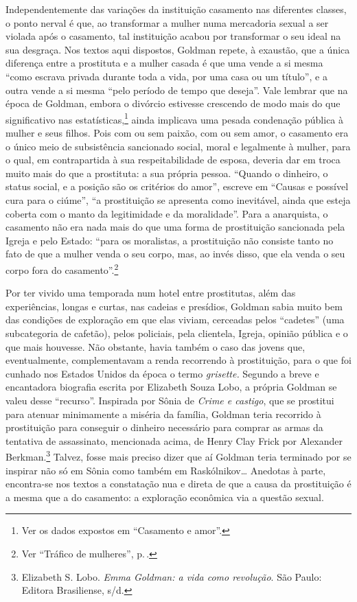 Independentemente das variações da instituição casamento nas diferentes
classes, o ponto nerval é que, ao transformar a mulher
numa mercadoria sexual a ser violada
após o casamento, tal instituição acabou por transformar o seu ideal na sua desgraça.
Nos textos aqui dispostos, Goldman repete, à exaustão,
que a única diferença entre a prostituta e a mulher casada é que uma
vende a si mesma ``como escrava privada durante toda a vida, por uma
casa ou um título'', e a outra vende a si mesma ``pelo período de tempo
que deseja''. Vale lembrar que na época de Goldman, embora o divórcio
estivesse crescendo de modo mais do que significativo nas estatísticas,\footnote{Ver os dados expostos em ``Casamento e amor''.}
ainda implicava uma
pesada condenação pública à mulher e seus filhos. Pois com ou sem
paixão, com ou sem amor, o casamento era o único meio de subsistência
sancionado social, moral e legalmente à mulher, para o qual, em
contrapartida à sua respeitabilidade de esposa, deveria dar em troca
muito mais do que a prostituta: a sua própria pessoa. ``Quando o
dinheiro, o status social, e a posição são os critérios do amor'',
escreve em ``Causas e possível cura para o ciúme'', ``a prostituição se
apresenta como inevitável, ainda que esteja coberta com o manto da
legitimidade e da moralidade''. Para a anarquista, o casamento não era
nada mais do que uma forma de prostituição sancionada pela Igreja e pelo
Estado: ``para os moralistas, a prostituição não consiste tanto no fato de que a mulher
venda o seu corpo, mas, ao invés disso, que ela venda o seu corpo fora
do casamento''.\footnote{Ver ``Tráfico de mulheres'', p.\,\pageref{vender}.}

Por ter vivido uma temporada num hotel entre prostitutas, além das
experiências, longas e curtas, nas cadeias e presídios, Goldman sabia
muito bem das condições de exploração em que elas viviam, cerceadas
pelos ``cadetes'' (uma subcategoria de cafetão), pelos policiais, pela
clientela, Igreja, opinião pública e o que mais houvesse. Não obstante,
havia também o caso das jovens que, eventualmente, complementavam a
renda recorrendo à prostituição, para o que foi cunhado nos Estados
Unidos da época o termo \emph{grisette.} Segundo a breve e encantadora
biografia escrita por Elizabeth Souza Lobo, a própria Goldman se valeu
desse ``recurso''. Inspirada por Sônia de \emph{Crime e castigo}, que se
prostitui para atenuar minimamente a miséria da família, Goldman
teria recorrido à prostituição para conseguir o
dinheiro necessário para comprar as armas da tentativa de assassinato,
mencionada acima, de Henry Clay Frick por Alexander Berkman.\footnote{Elizabeth S. Lobo. \textit{Emma Goldman: a vida como revolução}. São Paulo: Editora Brasiliense, s/d.}
Talvez, fosse mais preciso dizer que aí Goldman teria terminado por se
inspirar não só em Sônia como também em Raskólnikov\ldots{} Anedotas à parte,
encontra-se nos textos a constatação nua e
direta de que a causa da prostituição é a mesma que a do casamento: a
exploração econômica via a questão sexual.


